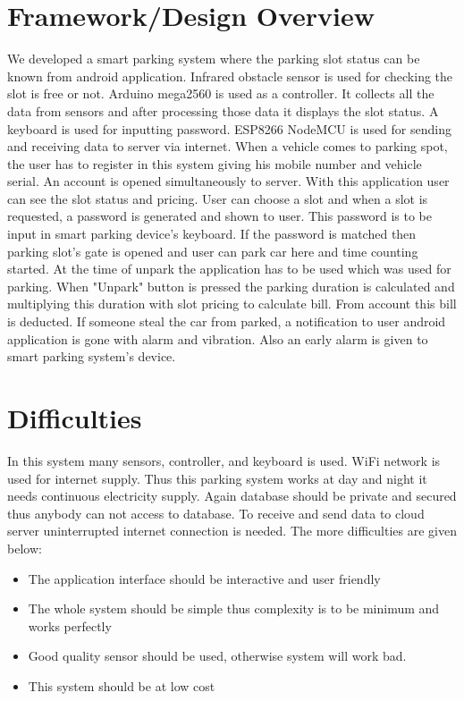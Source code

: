 \section{Framework/Design Overview}
We developed a smart parking system where the parking slot status can be known from android application. Infrared obstacle sensor is used for checking the slot is free or not. Arduino mega2560 is used as a controller. It collects all the data from sensors and after processing those data it displays the slot status. A keyboard is used for inputting password. ESP8266 NodeMCU is used for sending and receiving data to server via internet. When a vehicle comes to parking spot, the user has to register in this system giving his mobile number and vehicle serial. An account is opened simultaneously to server. With this application user can see the slot status and pricing. User can choose a slot and when a slot is requested, a password is generated and shown to user. This password is to be input in smart parking device's keyboard. If the password is matched then parking slot's gate is opened and user can park car here and time counting started. At the time of unpark the application has to be used which was used for parking. When "Unpark" button is pressed the parking duration is calculated and multiplying this duration with slot pricing to calculate bill. From account this bill is deducted. If someone steal the car from parked, a notification to user android application is gone with alarm and vibration. Also an early alarm is given to smart parking system's device.

\section{Difficulties}
In this system many sensors, controller, and keyboard is used. WiFi network is used for internet supply. Thus this parking system works at day and night it needs continuous electricity supply. Again database should be private and secured thus anybody can not access to database. To receive and send data to cloud server uninterrupted internet connection is needed.
The more difficulties are given below:
\begin{itemize}
    \item The application interface should be interactive and user friendly
    \item The whole system should be simple thus complexity is to be minimum and works perfectly
    \item Good quality sensor should be used, otherwise system will work bad.
    \item This system should be at low cost
\end{itemize}

